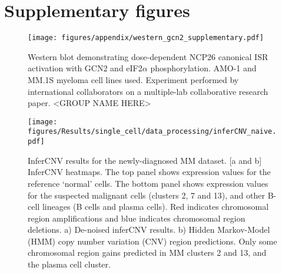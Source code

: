 \chapter{Supplementary figures}

\begin{figure}[ht]
\centering
\texttt{[image: figures/appendix/western\_gcn2\_supplementary.pdf]}
\caption[GCN2 and eIF2$\alpha$ western blot ]{Western blot demonstrating dose-dependent NCP26 canonical ISR activation with GCN2 and eIF2$\alpha$ phosphorylation. AMO-1 and MM.1S myeloma cell lines used.
Experiment performed by international collaborators on a multiple-lab collaborative research paper. <GROUP NAME HERE>
}
\label{fig:sup_western}
\end{figure}



\begin{figure}[htb]
    \centering
    \texttt{[image: figures/Results/single\_cell/data\_processing/inferCNV\_naive.pdf]}
    \caption[inferCNV- newly-diagnosed MM]{InferCNV results for the newly-diagnosed MM dataset.
    [a and b] InferCNV heatmaps.
        The top panel shows expression values for the reference `normal' cells.
        The bottom panel shows expression values for the suspected malignant cells (clusters 2, 7 and 13), and other B-cell lineages (B cells and plasma cells).
        Red indicates chromosomal region amplifications and blue indicates chromosomal region deletions.
    a) De-noised inferCNV results.
    b) Hidden Markov-Model (HMM) copy number variation (CNV) region predictions.
        Only some chromosomal region gains predicted in MM clusters 2 and 13, and the plasma cell cluster.
    }
    \label{fig:inferCNV_naive}
\end{figure}
%